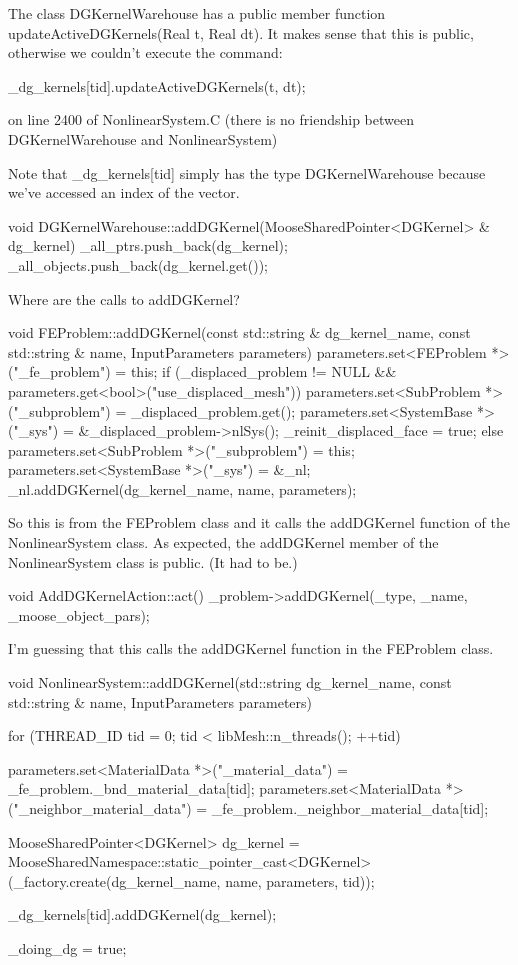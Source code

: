 The class DGKernelWarehouse has a public member function updateActiveDGKernels(Real t, Real dt). It makes sense that this is public, otherwise we couldn't execute the command:

_dg_kernels[tid].updateActiveDGKernels(t, dt);

on line 2400 of NonlinearSystem.C (there is no friendship between DGKernelWarehouse and NonlinearSystem)

Note that _dg_kernels[tid] simply has the type DGKernelWarehouse because we've accessed an index of the vector.

void
DGKernelWarehouse::addDGKernel(MooseSharedPointer<DGKernel> & dg_kernel)
{
  _all_ptrs.push_back(dg_kernel);
  _all_objects.push_back(dg_kernel.get());
}

Where are the calls to addDGKernel?

void
FEProblem::addDGKernel(const std::string & dg_kernel_name, const std::string & name, InputParameters parameters)
{
  parameters.set<FEProblem *>("_fe_problem") = this;
  if (_displaced_problem != NULL && parameters.get<bool>("use_displaced_mesh"))
  {
    parameters.set<SubProblem *>("_subproblem") = _displaced_problem.get();
    parameters.set<SystemBase *>("_sys") = &_displaced_problem->nlSys();
    _reinit_displaced_face = true;
  }
  else
  {
    parameters.set<SubProblem *>("_subproblem") = this;
    parameters.set<SystemBase *>("_sys") = &_nl;
  }
  _nl.addDGKernel(dg_kernel_name, name, parameters);
}

So this is from the FEProblem class and it calls the addDGKernel function of the NonlinearSystem class. As expected, the addDGKernel member of the NonlinearSystem class is public. (It had to be.)

void
AddDGKernelAction::act()
{
  _problem->addDGKernel(_type, _name, _moose_object_pars);
}

I'm guessing that this calls the addDGKernel function in the FEProblem class.

void
NonlinearSystem::addDGKernel(std::string dg_kernel_name, const std::string & name, InputParameters parameters)
{
  for (THREAD_ID tid = 0; tid < libMesh::n_threads(); ++tid)
  {
    parameters.set<MaterialData *>("_material_data") = _fe_problem._bnd_material_data[tid];
    parameters.set<MaterialData *>("_neighbor_material_data") = _fe_problem._neighbor_material_data[tid];

    MooseSharedPointer<DGKernel> dg_kernel = MooseSharedNamespace::static_pointer_cast<DGKernel>(_factory.create(dg_kernel_name, name, parameters, tid));

    _dg_kernels[tid].addDGKernel(dg_kernel);
  }

  _doing_dg = true;
}

